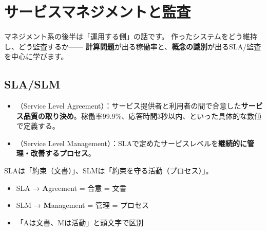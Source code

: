 \chapter{サービスマネジメントと監査}


マネジメント系の後半は「運用する側」の話です。
作ったシステムをどう維持し、どう監査するか——
\textbf{計算問題}が出る稼働率と、\textbf{概念の識別}が出るSLA/監査を中心に学びます。

\section{SLA/SLM}

\begin{teigi}[SLAとSLM]
\begin{itemize}
  \item {}（Service Level Agreement）：サービス提供者と利用者の間で合意した\textbf{サービス品質の取り決め}。稼働率99.9\%、応答時間3秒以内、といった具体的な数値で定義する。
  \item {}（Service Level Management）：SLAで定めたサービスレベルを\textbf{継続的に管理・改善するプロセス}。
\end{itemize}
SLAは「約束（文書）」、SLMは「約束を守る活動（プロセス）」。
\end{teigi}

\begin{pitfall}[SLAとSLMを逆にしがち]
\begin{itemize}
  \item SLA → \textbf{A}greement = 合意 = 文書
  \item SLM → \textbf{M}anagement = 管理 = プロセス
  \item 「Aは文書、Mは活動」と頭文字で区別
\end{itemize}
\end{pitfall}

